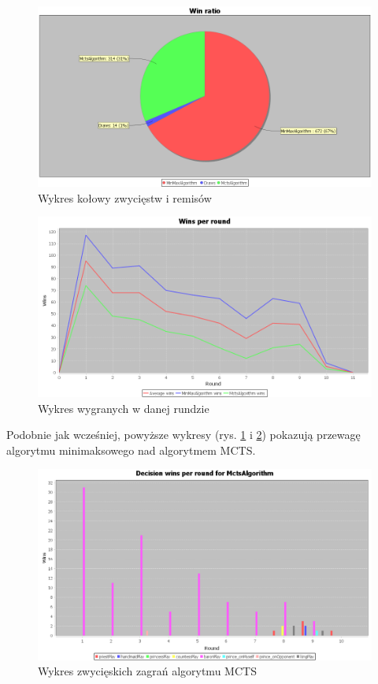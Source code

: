 \begin{figure}[H]
	\centering
	\includegraphics[width=\textwidth]{Resources/MirrorMmVsMcts/MmVsMctsWin.PNG}
	\caption{Wykres kołowy zwycięstw i remisów} 
	\label{fig:MmVsMctsWin}
\end{figure}

\begin{figure}[H]
	\centering
	\includegraphics[width=\textwidth]{Resources/MirrorMmVsMcts/MmVsMctsRoundWin.PNG}
	\caption{Wykres wygranych w danej rundzie} 
	\label{fig:MmVsMctsRoundWin}
\end{figure}

Podobnie jak wcześniej, powyższe wykresy (rys. \ref{fig:MmVsMctsWin} i \ref{fig:MmVsMctsRoundWin}) pokazują przewagę algorytmu minimaksowego nad algorytmem MCTS.

\begin{figure}[H]
	\centering
	\includegraphics[width=\textwidth]{Resources/MirrorMmVsMcts/MctsVsMmDecision.PNG}
	\caption{Wykres zwycięskich zagrań algorytmu MCTS} 
	\label{fig:MctsVsMmDecision}
\end{figure} 

